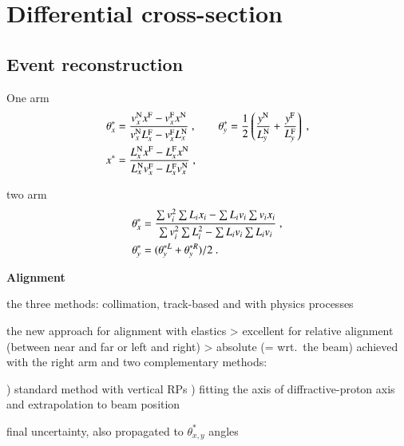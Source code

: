 \section{Differential cross-section}

\subsection{Event reconstruction}

One arm
\begin{equation}
\label{eq:kin 1a}
	\begin{aligned}
		\theta_x^* &= {v_x^{\rm N} x^{\rm F} - v_x^{\rm F} x^{\rm N}\over v_x^{\rm N} L_x^{\rm F} - v_x^{\rm F} L_x^{\rm N}}\ ,\qquad
		\theta_y^* = {1\over 2} \left( {y^{\rm N}\over L_y^{\rm N}} + {y^{\rm F}\over L_y^{\rm F}} \right)\ ,\\
		x^* &= {L_x^{\rm N} x^{\rm F} - L_x^{\rm F} x^{\rm N}\over L_x^{\rm N} v_x^{\rm F} - L_x^{\rm F} v_x^{\rm N}}\ , \\
	\end{aligned}
\end{equation}

two arm
\begin{equation}
\label{eq:kin 2a}
	\begin{aligned}
		\theta_x^* &= {
				\sum v_i^2 \sum L_i x_i - \sum L_i v_i \sum v_i x_i
				\over
				\sum v_i^2 \sum L_i^2 - \sum L_i v_i \sum L_i v_i
			}\ ,\\
		\theta_y^* &= (\theta_y^{*L} + \theta_y^{*R})/2\ .\\
	\end{aligned}
\end{equation}

{\bf Alignment}

\> the three methods: collimation, track-based and with physics processes

\> the new approach for alignment with elastics
\>> excellent for relative alignment (between near and far or left and right)
\>> absolute (= wrt.~the beam) achieved with the right arm and two complementary methods:

) standard method with vertical RPs
) fitting the axis of diffractive-proton axis and extrapolation to beam position

\> final uncertainty, also propagated to $\theta^*_{x, y}$ angles

